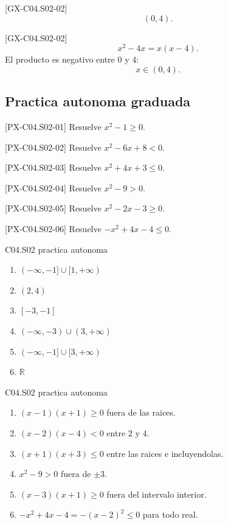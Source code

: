 \begin{shortanswer}{[GX-C04.S02-02]}
\[
(0,4).
\]
\end{shortanswer}

\begin{fullsolution}{[GX-C04.S02-02]}
\[
x^2-4x=x(x-4).
\]
El producto es negativo entre \(0\) y \(4\):
\[
x\in (0,4).
\]
\end{fullsolution}

\subsection*{Practica autonoma graduada}
\begin{exercise}{[PX-C04.S02-01] Resuelve \(x^2-1\geq 0\).}
\end{exercise}
\begin{exercise}{[PX-C04.S02-02] Resuelve \(x^2-6x+8<0\).}
\end{exercise}
\begin{exercise}{[PX-C04.S02-03] Resuelve \(x^2+4x+3\leq 0\).}
\end{exercise}
\begin{exercise}{[PX-C04.S02-04] Resuelve \(x^2-9>0\).}
\end{exercise}
\begin{exercise}{[PX-C04.S02-05] Resuelve \(x^2-2x-3\geq 0\).}
\end{exercise}
\begin{exercise}{[PX-C04.S02-06] Resuelve \(-x^2+4x-4\leq 0\).}
\end{exercise}

\begin{shortanswer}{C04.S02 practica autonoma}
\begin{enumerate}[label=\textbf{PX-C04.S02-\arabic*:}, leftmargin=*]
  \item \((-\infty,-1]\cup [1,+\infty)\)
  \item \((2,4)\)
  \item \([-3,-1]\)
  \item \((-\infty,-3)\cup (3,+\infty)\)
  \item \((-\infty,-1]\cup [3,+\infty)\)
  \item \(\mathbb{R}\)
\end{enumerate}
\end{shortanswer}

\begin{fullsolution}{C04.S02 practica autonoma}
\begin{enumerate}[label=\textbf{PX-C04.S02-\arabic*:}, leftmargin=*]
  \item \((x-1)(x+1)\geq 0\) fuera de las raices.
  \item \((x-2)(x-4)<0\) entre \(2\) y \(4\).
  \item \((x+1)(x+3)\leq 0\) entre las raices e incluyendolas.
  \item \(x^2-9>0\) fuera de \(\pm 3\).
  \item \((x-3)(x+1)\geq 0\) fuera del intervalo interior.
  \item \(-x^2+4x-4=-(x-2)^2\leq 0\) para todo real.
\end{enumerate}
\end{fullsolution}

